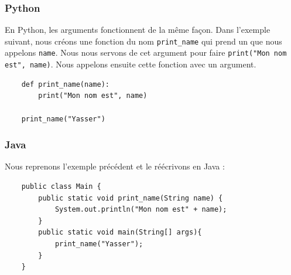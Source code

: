 \subsubsection{Python}

En Python, les arguments fonctionnent de la même façon. Dans l'exemple suivant, nous créons une fonction du nom \lstinline{print_name} qui prend un  que nous appelons \lstinline{name}. Nous nous servons de cet argument pour faire \lstinline{print("Mon nom est", name)}. Nous appelons ensuite cette fonction avec un argument.  
\begin{verbatim}
    def print_name(name):
        print("Mon nom est", name)
        
    print_name("Yasser")
\end{verbatim}

\subsubsection{Java}

Nous reprenons l'exemple précédent et le réécrivons en Java :
\begin{verbatim}
    public class Main {
        public static void print_name(String name) {
            System.out.println("Mon nom est" + name); 
        }
        public static void main(String[] args){
            print_name("Yasser");
        }
    }
\end{verbatim}

